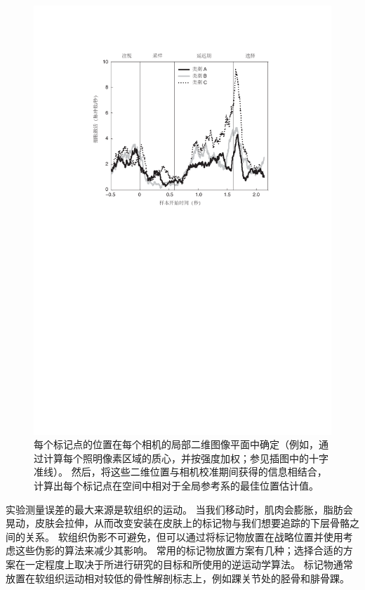 \begin{figure}[!htb]
	\centering
	\includegraphics[width=1.0\linewidth]{chap7/7_7}
	\caption{每个标记点的位置在每个相机的局部二维图像平面中确定（例如，通过计算每个照明像素区域的质心，并按强度加权；参见插图中的十字准线）。
		然后，将这些二维位置与相机校准期间获得的信息相结合，计算出每个标记点在空间中相对于全局参考系的最佳位置估计值。  \label{fig:7_7}}
\end{figure}


实验测量误差的最大来源是软组织的运动。
当我们移动时，肌肉会膨胀，脂肪会晃动，皮肤会拉伸，从而改变安装在皮肤上的标记物与我们想要追踪的下层骨骼之间的关系。
软组织伪影不可避免，但可以通过将标记物放置在战略位置并使用考虑这些伪影的算法来减少其影响。
常用的标记物放置方案有几种；选择合适的方案在一定程度上取决于所进行研究的目标和所使用的逆运动学算法。
标记物通常放置在软组织运动相对较低的骨性解剖标志上，例如踝关节处的胫骨和腓骨踝。


